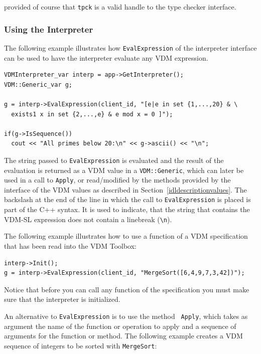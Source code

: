 \documentclass[\pformat,12pt]{article}
\begin{document}
provided of course that \texttt{tpck} is a valid handle to the type
checker interface.  

\subsubsection{Using the Interpreter}\label{cpp:interp}
\label{usingtheinterpreter}

The following example illustrates how {\tt EvalExpression} of the
interpreter interface can be used to have the interpreter evaluate any
VDM expression.

\begin{verbatim}
VDMInterpreter_var interp = app->GetInterpreter();
VDM::Generic_var g;

g = interp->EvalExpression(client_id, "[e|e in set {1,...,20} & \
  exists1 x in set {2,...,e} & e mod x = 0 ]");

if(g->IsSequence())
  cout << "All primes below 20:\n" << g->ascii() << "\n";
\end{verbatim}

The string passed to {\tt EvalExpression} is evaluated and the result
  of the evaluation is returned as a VDM value in a {\tt VDM::Generic},
  which can later be used in a call to {\tt Apply}, or read/modified by the
  methods provided by the interface of the VDM values as described in
  Section~\ref{idldescriptionvalues}. The backslash at the end of the
  line in which the call to \texttt{EvalExpression} is placed is part
  of the C++ 
  syntax. It is used to indicate, that the string that contains the 
  VDM-SL expression does not contain a linebreak (\verb+\n+). 

The following example illustrates how to use a function of a VDM
specification that has been read into the VDM Toolbox: 

\begin{verbatim}
interp->Init();
g = interp->EvalExpression(client_id, "MergeSort([6,4,9,7,3,42])");
\end{verbatim}

Notice that before you can call any function of the specification you
must make sure that the interpreter is initialized.  

An alternative to {\tt EvalExpression} is to use the method {\tt
  Apply}, which takes as argument the name of the function or
operation to apply and a sequence of arguments for the function or
method. The following example creates a VDM sequence of integers to be
sorted with {\tt MergeSort}:
\end{document}
